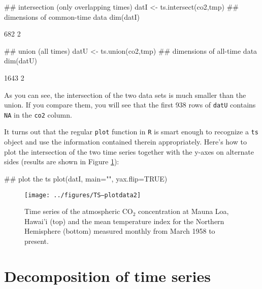 \begin{Schunk}
\begin{Sinput}
 ## intersection (only overlapping times)
 datI <- ts.intersect(co2,tmp)
 ## dimensions of common-time data
 dim(datI)
\end{Sinput}
\begin{Soutput}
[1] 682   2
\end{Soutput}
\begin{Sinput}
 ## union (all times)
 datU <- ts.union(co2,tmp)
 ## dimensions of all-time data
 dim(datU)
\end{Sinput}
\begin{Soutput}
[1] 1643    2
\end{Soutput}
\end{Schunk}

\noindent As you can see, the intersection of the two data sets is much smaller than the union.  If you compare them, you will see that the first 938 rows of \texttt{datU} contains \texttt{NA} in the \texttt{co2} column.

It turns out that the regular \texttt{plot} function in \texttt{R} is smart enough to recognize a \texttt{ts} object and use the information contained therein appropriately.  Here's how to plot the intersection of the two time series together with the y-axes on alternate sides (results are shown in Figure \ref{fig:LW1.fig2}):

\begin{Schunk}
\begin{Sinput}
 ## plot the ts
 plot(datI, main="", yax.flip=TRUE)
\end{Sinput}
\end{Schunk}

\begin{figure}[htp]
\begin{center}
\texttt{[image: ../figures/TS--plotdata2]}
\end{center}
\caption{Time series of the atmospheric CO$_2$ concentration at Mauna Loa, Hawai'i (top) and the mean temperature index for the Northern Hemisphere (bottom) measured monthly from March 1958 to present.}
\label{fig:LW1.fig2}
\end{figure}

\section{Decomposition of time series}

